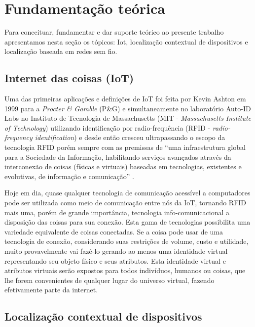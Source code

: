 \chapter{Fundamentação teórica}
\label{chap:Fundamentação teorica}


Para conceituar, fundamentar e dar suporte teórico ao presente trabalho
apresentamos nesta seção os tópicos: Iot, localização contextual de dispositivos
e localização baseada em redes sem fio.

\section{Internet das coisas (IoT)}
\label{sec:INTERNET DAS COISAS (IOT)}

Uma das primeiras aplicações e definições de IoT foi feita por Kevin Ashton em
1999 para a \textit{Procter \& Gamble} (P\&G) \cite{ASHTON2009} e
simultaneamente no laboratório Auto-ID Labs no Instituto de Tecnologia de
Massachusetts (MIT - \textit{Massachusetts Institute of Technology}) utilizando
identificação por radio-frequência (RFID - \textit{radio-frequency
identification}) \cite{ATZORI2010} \cite{Friedemann2011} e desde então cresceu
ultrapassando o escopo da tecnologia RFID porém sempre com as premissas de ``uma
infraestrutura global para a Sociedade da Informação, habilitando serviços
avançados através da interconexão de coisas (físicas e virtuais) baseadas em
tecnologias, existentes e evolutivas, de informação e comunicação''
 \cite{Wortmann2015}.

Hoje em dia, quase qualquer tecnologia de comunicação acessível a computadores
pode ser utilizada como meio de comunicação entre nós da IoT, tornando RFID mais
uma, porém de grande importância, tecnologia info-comunicacional a disposição
das coisas para sua conexão. Esta gama de tecnologias possibilita uma variedade
equivalente de coisas conectadas. Se a coisa pode usar de uma tecnologia de
conexão, considerando suas restrições de volume, custo e utilidade, muito
provavelmente vai fazê-lo gerando ao menos uma identidade virtual representando
seu objeto físico e seus atributos. Esta identidade virtual e atributos virtuais
serão expostos para todos indivíduos, humanos ou coisas, que lhe forem
convenientes de qualquer lugar do universo virtual, fazendo efetivamente parte
da internet.

\section{Localização contextual de dispositivos}
\label{sec:Localização contextual de dispositivos}

